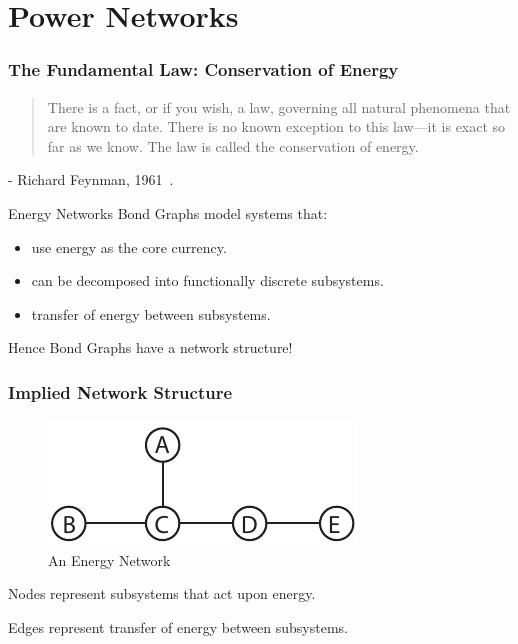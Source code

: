 \documentclass[11pt,reqno]{beamer}
\begin{document}
\section{Power Networks}
\begin{frame}
\frametitle{The Fundamental Law: Conservation of Energy}
\begin{quotation}
	There is a fact, or if you wish, a law, governing all natural phenomena that are known to date. There is no known exception to this law—it is exact so far as we know. The law is called the conservation of energy.
\end{quotation}

- Richard Feynman, 1961~\cite{Feynman1961}.
\end{frame}
\begin{frame}{Energy Networks}
Bond Graphs model systems that:
\begin{itemize}
	\item use energy as the core currency.
	\item can be decomposed into functionally discrete subsystems.
	\item transfer of energy between subsystems.
\end{itemize}
\vspace{1cm}
Hence Bond Graphs have a network structure!
\end{frame}
\begin{frame}
\frametitle{Implied Network Structure}
\begin{figure}
	\centering
	\includegraphics{network_1.pdf}
	\caption{An Energy Network}
\end{figure}
Nodes represent subsystems that act upon energy.

\vspace{5pt}

Edges represent transfer of energy between subsystems.
\end{frame}
\end{document}
